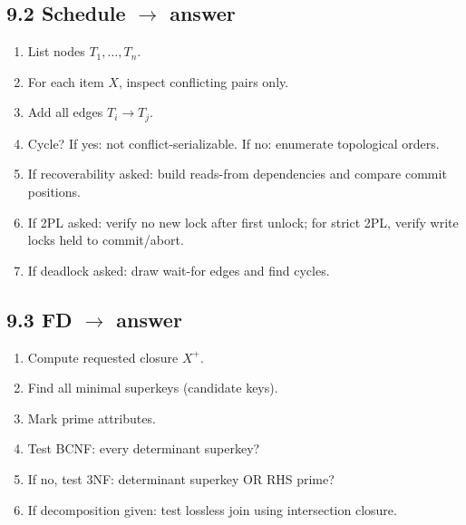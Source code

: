\documentclass[10pt,a4paper]{article}
\begin{document}
\subsection{9.2 Schedule $\to$ answer}
\begin{enumerate}
\item List nodes $T_1,\ldots,T_n$.
\item For each item $X$, inspect conflicting pairs only.
\item Add all edges $T_i\to T_j$.
\item Cycle? If yes: not conflict-serializable. If no: enumerate topological orders.
\item If recoverability asked: build reads-from dependencies and compare commit positions.
\item If 2PL asked: verify no new lock after first unlock; for strict 2PL, verify write locks held to commit/abort.
\item If deadlock asked: draw wait-for edges and find cycles.
\end{enumerate}

\subsection{9.3 FD $\to$ answer}
\begin{enumerate}
\item Compute requested closure $X^+$.
\item Find all minimal superkeys (candidate keys).
\item Mark prime attributes.
\item Test BCNF: every determinant superkey?
\item If no, test 3NF: determinant superkey OR RHS prime?
\item If decomposition given: test lossless join using intersection closure.
\end{enumerate}

\end{document}
